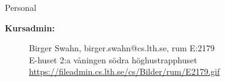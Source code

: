 \begin{SlideExtra}{Personal \CurrentYear}
\begin{description}
\item [\bfseries Kursadmin:]
Birger Swahn, birger.swahn@cs.lth.se, rum E:2179\\E-huset 2:a våningen södra höghustrapphuset\\{\url{https://fileadmin.cs.lth.se/cs/Bilder/rum/E2179.gif}}
\end{description}
\end{SlideExtra}
\fi


